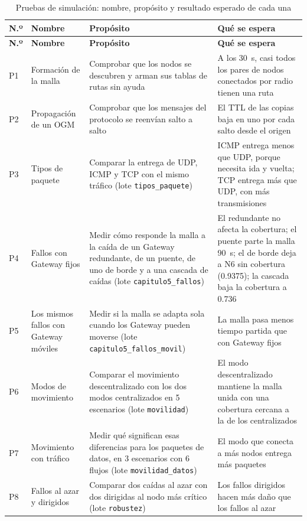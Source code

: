 {\footnotesize
\begin{longtable}{|p{0.6cm}|p{2.6cm}|p{4.5cm}|p{5.3cm}|}
    \caption{Pruebas de simulación: nombre, propósito y resultado esperado de cada una\label{tab:experimentos}}\\
    \hline
    \textbf{N.º} & \textbf{Nombre} & \textbf{Propósito} & \textbf{Qué se espera} \\
    \hline
    \endfirsthead
    \hline
    \textbf{N.º} & \textbf{Nombre} & \textbf{Propósito} & \textbf{Qué se espera} \\
    \hline
    \endhead
    P1 & Formación de la malla & Comprobar que los nodos se descubren y arman sus tablas de rutas sin ayuda & A los 30~s, casi todos los pares de nodos conectados por radio tienen una ruta \\
    \hline
    P2 & Propagación de un OGM & Comprobar que los mensajes del protocolo se reenvían salto a salto & El TTL de las copias baja en uno por cada salto desde el origen \\
    \hline
    P3 & Tipos de paquete & Comparar la entrega de UDP, ICMP y TCP con el mismo tráfico (lote \texttt{tipos\_paquete}) & ICMP entrega menos que UDP, porque necesita ida y vuelta; TCP entrega más que UDP, con más transmisiones \\
    \hline
    P4 & Fallos con Gateway fijos & Medir cómo responde la malla a la caída de un Gateway redundante, de un puente, de uno de borde y a una cascada de caídas (lote \texttt{capitulo5\_fallos}) & El redundante no afecta la cobertura; el puente parte la malla 90~s; el de borde deja a N6 sin cobertura (0.9375); la cascada baja la cobertura a 0.736 \\
    \hline
    P5 & Los mismos fallos con Gateway móviles & Medir si la malla se adapta sola cuando los Gateway pueden moverse (lote \texttt{capitulo5\_fallos\_movil}) & La malla pasa menos tiempo partida que con Gateway fijos \\
    \hline
    P6 & Modos de movimiento & Comparar el movimiento descentralizado con los dos modos centralizados en 5 escenarios (lote \texttt{movilidad}) & El modo descentralizado mantiene la malla unida con una cobertura cercana a la de los centralizados \\
    \hline
    P7 & Movimiento con tráfico & Medir qué significan esas diferencias para los paquetes de datos, en 3 escenarios con 6 flujos (lote \texttt{movilidad\_datos}) & El modo que conecta a más nodos entrega más paquetes \\
    \hline
    P8 & Fallos al azar y dirigidos & Comparar dos caídas al azar con dos dirigidas al nodo más crítico (lote \texttt{robustez}) & Los fallos dirigidos hacen más daño que los fallos al azar \\

\end{longtable}}
